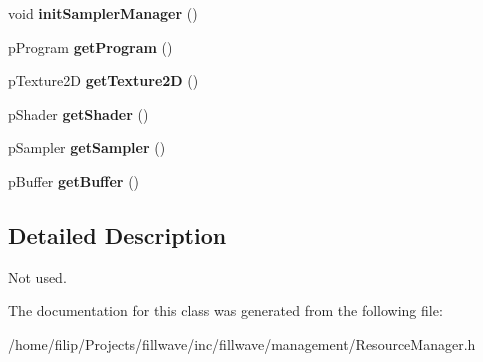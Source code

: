 \begin{DoxyCompactItemize}
\item 
\hypertarget{classfillwave_1_1manager_1_1ResourceManager_a04b08dc16682f49ae61b1617f4fe856e}{}void {\bfseries init\+Sampler\+Manager} ()\label{classfillwave_1_1manager_1_1ResourceManager_a04b08dc16682f49ae61b1617f4fe856e}

\item 
\hypertarget{classfillwave_1_1manager_1_1ResourceManager_af6c882053501b3e0b99f5fd8c9d799c6}{}p\+Program {\bfseries get\+Program} ()\label{classfillwave_1_1manager_1_1ResourceManager_af6c882053501b3e0b99f5fd8c9d799c6}

\item 
\hypertarget{classfillwave_1_1manager_1_1ResourceManager_a7afaef4a90cd9e490da24d484dc61828}{}p\+Texture2\+D {\bfseries get\+Texture2\+D} ()\label{classfillwave_1_1manager_1_1ResourceManager_a7afaef4a90cd9e490da24d484dc61828}

\item 
\hypertarget{classfillwave_1_1manager_1_1ResourceManager_a730ed2e1b6437260ba968ca893ba030d}{}p\+Shader {\bfseries get\+Shader} ()\label{classfillwave_1_1manager_1_1ResourceManager_a730ed2e1b6437260ba968ca893ba030d}

\item 
\hypertarget{classfillwave_1_1manager_1_1ResourceManager_ae3d04c23201e2638649c04f8005f13d3}{}p\+Sampler {\bfseries get\+Sampler} ()\label{classfillwave_1_1manager_1_1ResourceManager_ae3d04c23201e2638649c04f8005f13d3}

\item 
\hypertarget{classfillwave_1_1manager_1_1ResourceManager_a7337025e5854611f55fc618fa1c6bdf9}{}p\+Buffer {\bfseries get\+Buffer} ()\label{classfillwave_1_1manager_1_1ResourceManager_a7337025e5854611f55fc618fa1c6bdf9}

\end{DoxyCompactItemize}


\subsection{Detailed Description}
Not used. 

The documentation for this class was generated from the following file\+:\begin{DoxyCompactItemize}
\item 
/home/filip/\+Projects/fillwave/inc/fillwave/management/Resource\+Manager.\+h\end{DoxyCompactItemize}
